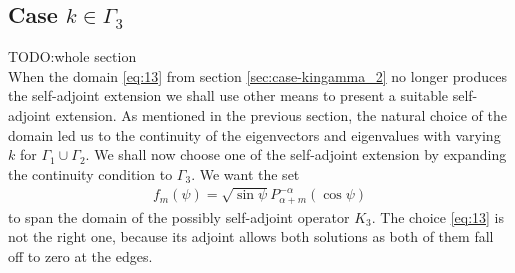 \subsection{Case $k\in\Gamma_3$}
\label{sec:case-kingamma_3}

TODO:whole section\\

When the domain \eqref{eq:13} from section \ref{sec:case-kingamma_2}
no longer produces the self-adjoint extension we shall use other means
to present a suitable self-adjoint extension. As mentioned in the
previous section, the natural choice of the domain led us to the
continuity of the eigenvectors and eigenvalues with varying $k$ for
$\Gamma_1\cup\Gamma_2$. We shall now choose one of the self-adjoint
extension by expanding the continuity condition to $\Gamma_3$. We want
the set
\begin{align}
  \label{eq:22}
  f_m(\psi)=\sqrt{\sin\psi}P_{\alpha+m}^{-\alpha}(\cos\psi)
\end{align}
to span the domain of the possibly self-adjoint operator $K_3$. The
choice \eqref{eq:13} is not the right one, because its adjoint allows
both solutions as both of them fall off to zero at the edges.

